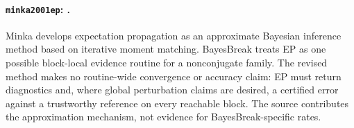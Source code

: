 
\paragraph{\texttt{minka2001ep}: \citet{minka2001ep}.}
Minka develops expectation propagation as an approximate Bayesian inference method based on iterative moment matching. BayesBreak treats EP as one possible block-local evidence routine for a nonconjugate family. The revised method makes no routine-wide convergence or accuracy claim: EP must return diagnostics and, where global perturbation claims are desired, a certified error against a trustworthy reference on every reachable block. The source contributes the approximation mechanism, not evidence for BayesBreak-specific rates.
